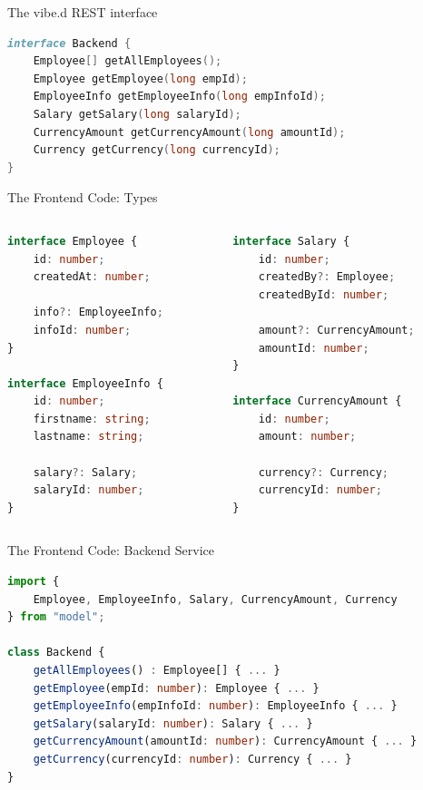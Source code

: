 \documentclass[aspectratio=169,notes]{beamer}
\begin{document}
	\begin{frame}[fragile]{The vibe.d REST interface}
\begin{lstlisting}[language=D,basicstyle=\normalsize\ttfamily]
interface Backend {
	Employee[] getAllEmployees();
	Employee getEmployee(long empId);
	EmployeeInfo getEmployeeInfo(long empInfoId);
	Salary getSalary(long salaryId);
	CurrencyAmount getCurrencyAmount(long amountId);
	Currency getCurrency(long currencyId);
}
\end{lstlisting}
	\end{frame}

	\begin{frame}[fragile]{The Frontend Code: Types}
\begin{columns}
\begin{column}{0.5\textwidth}
\begin{lstlisting}[language=typescript,basicstyle=\small\ttfamily]
interface Employee {
	id: number;
	createdAt: number;

	info?: EmployeeInfo;
	infoId: number;
}	

interface EmployeeInfo {
	id: number;
	firstname: string;
	lastname: string;

	salary?: Salary;
	salaryId: number;
}	
\end{lstlisting}
\end{column}
\begin{column}{0.5\textwidth}
\begin{lstlisting}[language=TypeScript,basicstyle=\small\ttfamily,firstnumber=17]
interface Salary {
	id: number;
	createdBy?: Employee;
	createdById: number;

	amount?: CurrencyAmount;
	amountId: number;
}

interface CurrencyAmount {
	id: number;
	amount: number;

	currency?: Currency;
	currencyId: number;
}
\end{lstlisting}
\end{column}
\end{columns}
	\end{frame}

	\begin{frame}[fragile]{The Frontend Code: Backend Service}
\begin{lstlisting}[language=TypeScript,basicstyle=\small\ttfamily,tabsize=4]
import { 
	Employee, EmployeeInfo, Salary, CurrencyAmount, Currency 
} from "model";

class Backend {
	getAllEmployees() : Employee[] { ... }
	getEmployee(empId: number): Employee { ... }
	getEmployeeInfo(empInfoId: number): EmployeeInfo { ... }
	getSalary(salaryId: number): Salary { ... }
	getCurrencyAmount(amountId: number): CurrencyAmount { ... }
	getCurrency(currencyId: number): Currency { ... }
}
\end{lstlisting}
	\end{frame}
\end{document}
